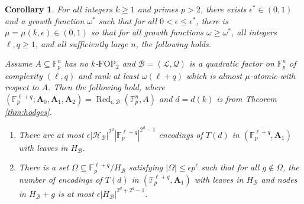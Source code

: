 \documentclass[12pt,oneside,british,a4wide]{amsart}
\newtheorem{corollary}[theorem]{Corollary}
\numberwithin{equation}{section}
\theoremstyle{definition}
\def\F{\mathbb{F}}
\def\FOP{\mathrm{FOP}}
\def\e{\epsilon}
\newcommand{\calL}{\mathcal{L}}
\newcommand{\calH}{\mathcal{H}}
\newcommand{\calB}{\mathcal{B}}
\newcommand{\calQ}{\mathcal{Q}}
\newcommand{\Red}{{\mathrm{Red}}}
\def\Red{\operatorname{Red}}
\begin{document}
\begin{corollary}\label{cor:fewbad}
For all integers $k\geq 1$ and primes $p>2$, there exists $\e^*\in (0,1)$ and a growth function $\omega^*$ such that for all $0<\e\leq \e^*$, there is $\mu=\mu(k,\e)\in (0,1)$ so that for all growth functions $\omega\geq \omega^*$, all integers $\ell,q\geq 1$, and all sufficiently large $n$, the following holds.

Assume $A\subseteq \F_p^n$ has no $k$-$\FOP_2$ and $\calB=(\calL,\calQ)$ is a quadratic factor on $\F_p^n$ of complexity $(\ell,q)$ and rank at least $\omega(\ell+q)$ which is almost $\mu$-atomic with respect to $A$.  Then the following hold, where $(\F_p^{\ell+q}; \mathbf{A}_0,\mathbf{A}_1,\mathbf{A}_2)=\Red_{\e,\calB}(\F_p^n, A)$ and  $d=d(k)$ is from Theorem \ref{thm:hodges}.
\begin{enumerate}[label=\normalfont(\arabic*)]
\item There are at most $\e |\calH_{\calB}|^{2^d}|\F_p^{\ell+q}|^{2^d-1}$ encodings of $T(d)$ in $(\F_p^{\ell+q},\mathbf{A}_1)$ with leaves in $H_{\calB}$.
\item There is a set $\Omega\subseteq \F_p^{\ell+q}/H_{\calB}$ satisfying $|\Omega|\leq \e p^{\ell}$ such that for all $g\notin \Omega$, the number of encodings of $T(d)$ in $(\F_p^{\ell+q},\mathbf{A}_1)$ with leaves in $H_{\calB}$ and nodes in $H_{\calB}+g$ is at most $\e |H_{\calB}|^{2^d+2^d-1}$.
\end{enumerate}
\end{corollary}
\end{document}
